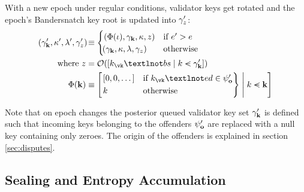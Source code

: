 With a new epoch under regular conditions, validator keys get rotated and the epoch's Bandersnatch key root is updated into $\gamma_z'$:
\begin{align}
  \tup{\pendingset', \activeset', \previousset', \epochroot'} &\equiv \begin{cases}
    (\Phi(\stagingset), \pendingset, \activeset, z) &\when e' > e \\ \tup{\pendingset, \activeset, \previousset, \epochroot} &\otherwise
  \end{cases} \\
  \nonumber \where z &= \getringroot{\sq{\build{k_\vk¬bs}{k \orderedin \pendingset'}}} \\
  \label{eq:blacklistfilter} \Phi(\mathbf{k}) &\equiv \sq{
    \build{
      \begin{rcases}
        \sq{0, 0, \dots} &\when \vkX_\vk¬ed \in \offenders' \\
        \vkX &\otherwise
      \end{rcases}
    }{
      \vkX \orderedin \mathbf{k}
    }
  }
\end{align}

Note that on epoch changes the posterior queued validator key set $\gamma_\mathbf{k}'$ is defined such that incoming keys belonging to the offenders $\psi_\mathbf{o}'$ are replaced with a null key containing only zeroes. The origin of the offenders is explained in section \ref{sec:disputes}.







\subsection{Sealing and Entropy Accumulation}\label{sec:sealandentropy}

